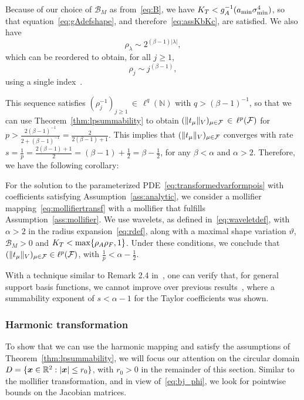 Because of our choice of $\mathcal{B}_M$ as from~\eqref{eq:B}, we have $K_T < g_A^{-1}(a_{\min}\sigma_{\min}^4)$, so that equation~\eqref{eq:gAdefshape}, and therefore~\eqref{eq:assKbKc}, are satisfied.
We also have
\begin{equation*}
    \rho_\lambda \sim 2^{(\beta-1)|\lambda|},
\end{equation*}
which can be reordered to obtain, for all $j \geq 1$,
\begin{equation*}
    \rho_j \sim j^{(\beta-1)},
\end{equation*}
using a single index~\cite{bachmayr2017a}.

This sequence satisfies $(\rho_j^{-1})_{j\geq 1} \, \in  \, \ell^q(\mathbb{N})$ with $q>(\beta-1)^{-1}$, so that we can use Theorem~\ref{thm:lpsummability} to obtain $(\|t_\mu\|_{{V}})_{\mu \in \mathcal{F}} \, \in \, \ell^p(\mathcal{F})$ for $p>\frac{2(\beta-1)^{-1}}{2+(\beta-1)^{-1}}=\frac{2}{2(\beta-1) + 1}$.
This implies that $(\|t_\mu\|_{{V}})_{\mu \in \mathcal{F}}$ converges with rate $s=\frac{1}{p} = \frac{2(\beta-1) + 1}{2} = (\beta-1) + \frac{1}{2} = \beta - \frac{1}{2}$, for any $\beta < \alpha$ and $\alpha > 2$.
Therefore, we have the following corollary:

\begin{corollary}\label{cor:mollifiersummability}
    For the solution to the parameterized PDE~\eqref{eq:transformedvarformpois} with coefficients satisfying Assumption~\ref{ass:analytic}, we consider a mollifier mapping~\eqref{eq:mollifiertransf} with a mollifier that fulfills Assumption~\ref{ass:mollifier}.
    We use wavelets, as defined in~\eqref{eq:waveletdef}, with $\alpha > 2$ in the radius expansion~\eqref{eq:rdef}, along with a maximal shape variation $\vartheta$, $\mathcal{B}_M > 0$ and $K_T < \max\{\rho_A \rho_F, 1\}$.
    Under these conditions, we conclude that $(\|t_\mu\|_{{V}})_{\mu \in \mathcal{F}} \in \ell^p(\mathcal{F})$, with $\frac{1}{p} < \alpha - \frac{1}{2}$.
\end{corollary}

\begin{remark}
    With a technique similar to Remark 2.4 in~\cite{bachmayr2017a}, one can verify that, for general support basis functions, we cannot improve over previous results~\cite{chkifa2015,hiptmair2018}, where a summability exponent of $s < \alpha - 1$ for the Taylor coefficients was shown.
\end{remark}


\subsubsection{Harmonic transformation}
\label{subsubsec:harmonic}
To show that we can use the harmonic mapping and satisfy the assumptions of Theorem~\ref{thm:lpsummability}, we will focus our attention on the circular domain $D=\{ {{\bm{x}}} \in \mathbb{R}^2 : |{{\bm{x}}}| \leq r_0\}$, with $r_0 > 0$ in the remainder of this section.
Similar to the mollifier transformation, and in view of~\eqref{eq:bj_phi}, we look for pointwise bounds on the Jacobian matrices.

